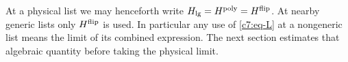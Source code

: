 At a physical list we may henceforth write
$H_{\rm lg}=H^{\rm poly}=H^{\rm flip}$. At nearby generic lists
only $H^{\rm flip}$ is used. In particular any use of
\eqref{c7:eq-L} at a nongeneric list means the limit of its combined
expression. The next section estimates that algebraic quantity
before taking the physical limit.
